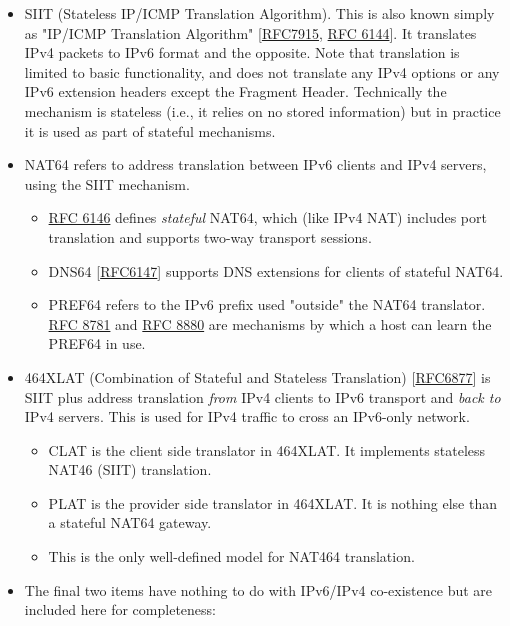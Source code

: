 \documentclass[
]{article}
\providecommand{\tightlist}{%
  \setlength{\itemsep}{0pt}\setlength{\parskip}{0pt}}
\begin{document}
\begin{itemize}
\item
  SIIT (Stateless IP/ICMP Translation Algorithm). This is also known
  simply as "IP/ICMP Translation Algorithm"
  {[}\href{https://www.rfc-editor.org/info/rfc7915}{RFC7915},
  \href{https://www.rfc-editor.org/info/rfc6144}{RFC 6144}{]}. It
  translates IPv4 packets to IPv6 format and the opposite. Note that
  translation is limited to basic functionality, and does not translate
  any IPv4 options or any IPv6 extension headers except the Fragment
  Header. Technically the mechanism is stateless (i.e., it relies on no
  stored information) but in practice it is used as part of stateful
  mechanisms.
\item
  NAT64 refers to address translation between IPv6 clients and IPv4
  servers, using the SIIT mechanism.

  \begin{itemize}
  \tightlist
  \item
    \href{https://www.rfc-editor.org/info/rfc6146}{RFC 6146} defines
    \emph{stateful} NAT64, which (like IPv4 NAT) includes port
    translation and supports two-way transport sessions.
  \item
    DNS64 {[}\href{https://www.rfc-editor.org/info/rfc6147}{RFC6147}{]}
    supports DNS extensions for clients of stateful NAT64.
  \item
    PREF64 refers to the IPv6 prefix used "outside" the NAT64
    translator. \href{https://www.rfc-editor.org/info/rfc8781}{RFC 8781}
    and \href{https://www.rfc-editor.org/info/rfc8880}{RFC 8880} are
    mechanisms by which a host can learn the PREF64 in use.
  \end{itemize}
\item
  464XLAT (Combination of Stateful and Stateless Translation)
  {[}\href{https://www.rfc-editor.org/info/rfc6877}{RFC6877}{]} is SIIT
  plus address translation \emph{from} IPv4 clients to IPv6 transport
  and \emph{back to} IPv4 servers. This is used for IPv4 traffic to
  cross an IPv6-only network.

  \begin{itemize}
  \tightlist
  \item
    CLAT is the client side translator in 464XLAT. It implements
    stateless NAT46 (SIIT) translation.
  \item
    PLAT is the provider side translator in 464XLAT. It is nothing else
    than a stateful NAT64 gateway.
  \item
    This is the only well-defined model for NAT464 translation.
  \end{itemize}
\item
  The final two items have nothing to do with IPv6/IPv4 co-existence but
  are included here for completeness:


\end{itemize}
\end{document}
